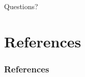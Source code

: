 \documentclass{beamer}
\begin{document}
\begin{frame}
    Questions?
\end{frame}



\section{References}

\begin{frame}[t, allowframebreaks]
    \frametitle{References}
    
    
\end{frame}
\end{document}
